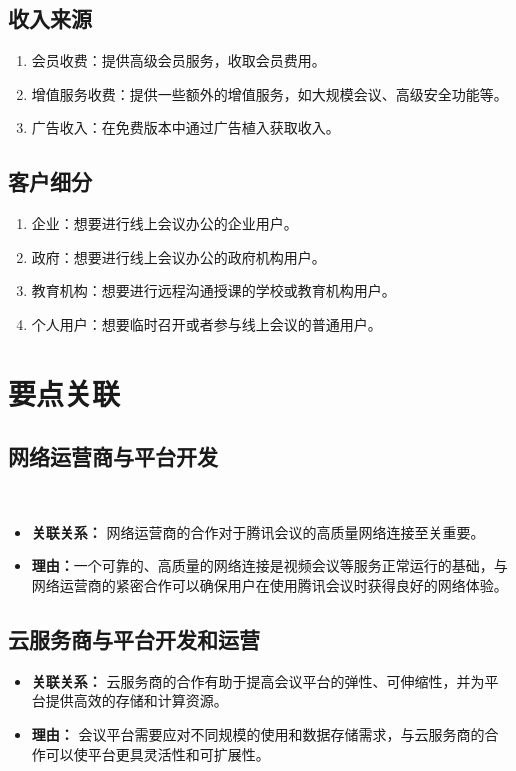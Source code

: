 \documentclass[a4paper,12pt]{article}
\begin{document}
    \subsection{收入来源}
    \begin{enumerate}
        \item 会员收费：提供高级会员服务，收取会员费用。
        \item 增值服务收费：提供一些额外的增值服务，如大规模会议、高级安全功能等。
        \item 广告收入：在免费版本中通过广告植入获取收入。
    \end{enumerate}

    \subsection{客户细分}
    \begin{enumerate}
        \item 企业：想要进行线上会议办公的企业用户。
        \item 政府：想要进行线上会议办公的政府机构用户。
        \item 教育机构：想要进行远程沟通授课的学校或教育机构用户。
        \item 个人用户：想要临时召开或者参与线上会议的普通用户。
    \end{enumerate}


    \section{要点关联}
    \subsection{网络运营商与平台开发}\
    \begin{itemize}
        \item \textbf{关联关系：} 网络运营商的合作对于腾讯会议的高质量网络连接至关重要。
        \item \textbf{理由：}一个可靠的、高质量的网络连接是视频会议等服务正常运行的基础，与网络运营商的紧密合作可以确保用户在使用腾讯会议时获得良好的网络体验。
    \end{itemize}
    \subsection{云服务商与平台开发和运营}
    \begin{itemize}
        \item\textbf{关联关系：} 云服务商的合作有助于提高会议平台的弹性、可伸缩性，并为平台提供高效的存储和计算资源。
        \item \textbf{理由：} 会议平台需要应对不同规模的使用和数据存储需求，与云服务商的合作可以使平台更具灵活性和可扩展性。
    \end{itemize}
\end{document}

